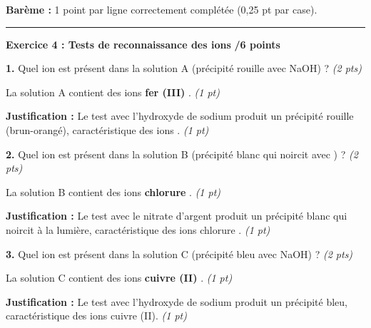\documentclass[11pt,a4paper]{article}
\begin{document}
	\begin{tcolorbox}[colback=blue!5!white,colframe=blue!75!black]
		\textbf{Barème :} 1 point par ligne correctement complétée (0,25 pt par case).
	\end{tcolorbox}
	
	\vspace{5mm}
	
	\hrule
	\vspace{3mm}
	
	\textbf{Exercice 4 : Tests de reconnaissance des ions} \hfill \textbf{/6 points}
	
	\vspace{3mm}
	
	\textbf{1.} Quel ion est présent dans la solution A (précipité rouille avec NaOH) ? \hfill \textit{(2 pts)}
	
	\begin{tcolorbox}[colback=green!5!white,colframe=green!75!black]
		La solution A contient des ions \textbf{fer (III)} . \textit{(1 pt)}
		
		\textbf{Justification :} Le test avec l'hydroxyde de sodium produit un précipité rouille (brun-orangé), caractéristique des ions . \textit{(1 pt)}
	\end{tcolorbox}
	
	\vspace{2mm}
	
	\textbf{2.} Quel ion est présent dans la solution B (précipité blanc qui noircit avec ) ? \hfill \textit{(2 pts)}
	
	\begin{tcolorbox}[colback=green!5!white,colframe=green!75!black]
		La solution B contient des ions \textbf{chlorure} . \textit{(1 pt)}
		
		\textbf{Justification :} Le test avec le nitrate d'argent produit un précipité blanc qui noircit à la lumière, caractéristique des ions chlorure . \textit{(1 pt)}
	\end{tcolorbox}
	
	\vspace{2mm}
	
	\textbf{3.} Quel ion est présent dans la solution C (précipité bleu avec NaOH) ? \hfill \textit{(2 pts)}
	
	\begin{tcolorbox}[colback=green!5!white,colframe=green!75!black]
		La solution C contient des ions \textbf{cuivre (II)} . \textit{(1 pt)}
		
		\textbf{Justification :} Le test avec l'hydroxyde de sodium produit un précipité bleu, caractéristique des ions cuivre (II). \textit{(1 pt)}
	\end{tcolorbox}
	
\end{document}
